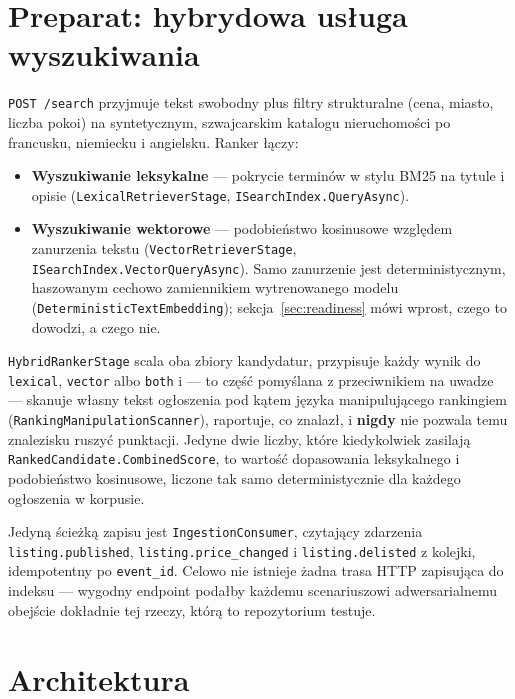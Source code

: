\documentclass[11pt,a4paper]{article}
\begin{document}
\section{Preparat: hybrydowa usługa wyszukiwania}

\texttt{POST /search} przyjmuje tekst swobodny plus filtry strukturalne (cena,
miasto, liczba pokoi) na syntetycznym, szwajcarskim katalogu nieruchomości po
francusku, niemiecku i angielsku. Ranker łączy:

\begin{itemize}[leftmargin=1.4em]
  \item \textbf{Wyszukiwanie leksykalne} --- pokrycie terminów w stylu BM25
        na tytule i opisie (\texttt{Lexical\-Retriever\-Stage},
        \texttt{ISearchIndex.\-QueryAsync}).
  \item \textbf{Wyszukiwanie wektorowe} --- podobieństwo kosinusowe względem
        zanurzenia tekstu (\texttt{VectorRetrieverStage},
        \texttt{ISearchIndex.\-VectorQueryAsync}). Samo zanurzenie jest
        deterministycznym, haszowanym cechowo zamiennikiem wytrenowanego
        modelu (\texttt{Deterministic\-Text\-Embedding});
        sekcja~\ref{sec:readiness} mówi wprost, czego to dowodzi, a czego nie.
\end{itemize}

\texttt{HybridRankerStage} scala oba zbiory kandydatur, przypisuje każdy wynik
do \texttt{lexical}, \texttt{vector} albo \texttt{both} i --- to część
pomyślana z przeciwnikiem na uwadze --- skanuje własny tekst ogłoszenia pod
kątem języka manipulującego rankingiem
(\texttt{RankingManipulationScanner}), raportuje, co znalazł, i
\textbf{nigdy} nie pozwala temu znalezisku ruszyć punktacji. Jedyne dwie
liczby, które kiedykolwiek zasilają \texttt{RankedCandidate.\-CombinedScore},
to wartość dopasowania leksykalnego i podobieństwo kosinusowe, liczone tak
samo deterministycznie dla każdego ogłoszenia w korpusie.

Jedyną ścieżką zapisu jest \texttt{IngestionConsumer}, czytający zdarzenia
\texttt{listing.published}, \texttt{listing.price\_changed} i
\texttt{listing.delisted} z kolejki, idempotentny po \texttt{event\_id}.
Celowo nie istnieje żadna trasa HTTP zapisująca do indeksu --- wygodny
endpoint podałby każdemu scenariuszowi adwersarialnemu obejście dokładnie tej
rzeczy, którą to repozytorium testuje.

\section{Architektura}
\label{sec:architecture}
\end{document}
